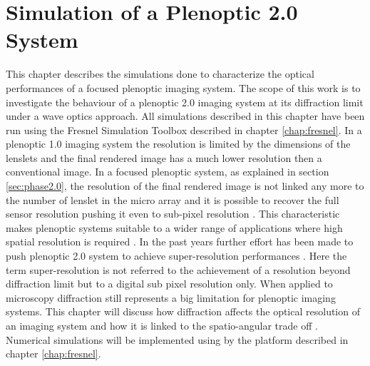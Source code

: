 \chapter{Simulation of a Plenoptic 2.0 System}
\label{chap:chapter5}
This chapter describes the simulations done to characterize the optical performances of a focused plenoptic imaging system. The scope of this work is to investigate the behaviour of a plenoptic 2.0 imaging system at its diffraction limit under a wave optics approach.  All simulations described in this chapter have been run using the Fresnel Simulation Toolbox  described in chapter \ref{chap:fresnel}. In a plenoptic 1.0 imaging system the resolution is limited by the dimensions of the lenslets \cite{georgiev2009resolution} and the final rendered image has a much lower resolution then a conventional image. In a focused plenoptic system, as explained in section \ref{sec:phase2.0}, the resolution of the final rendered image is not linked any more to the number of lenslet in the micro array and it is possible to recover the full sensor resolution pushing it even to sub-pixel resolution \cite{lumsdaine2008full,lumsdaine2009focused,georgiev2009superresolution}. This characteristic makes plenoptic systems suitable to a wider range of applications where high spatial resolution is required \cite{wetzstein2011computational}. In the past years further effort has been made to push plenoptic 2.0 system to achieve super-resolution performances \cite{georgiev2012super,georgiev2009superresolution,bishop2009light}. Here the term super-resolution is not referred to the achievement of a resolution beyond diffraction limit\cite{georgiev2015plenoptic} but to a digital sub pixel resolution only. When applied to microscopy diffraction still represents a big limitation for plenoptic imaging systems. This chapter will discuss how diffraction affects the optical resolution of an imaging system and how it is linked to the spatio-angular trade off \cite{georgiev2006spatio}. Numerical simulations will be implemented using by the platform described in chapter \ref{chap:fresnel}. 
\label{sec:intro4}
